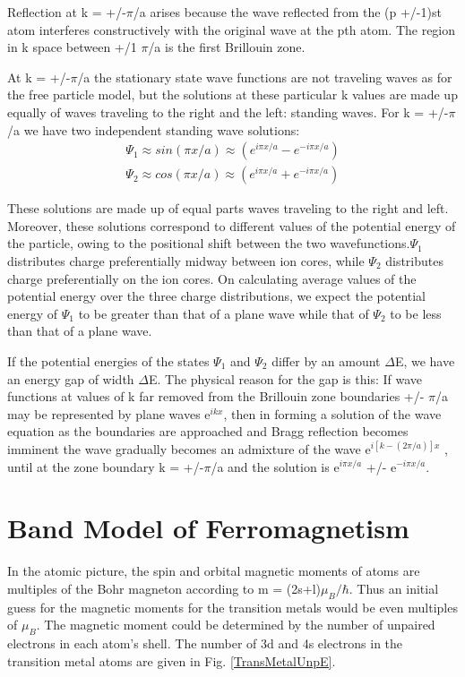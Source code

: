 Reflection at k = +/-$\pi$/a arises because the wave reflected from the (p +/-1)st atom interferes constructively with the original wave at the pth atom. The region in k space between +/1 $\pi$/a is the first Brillouin zone.

At k = +/-$\pi$/a the stationary state wave functions are not traveling waves as for the free particle model, but the solutions at these particular k values are made up equally of waves traveling to the right and the left: standing waves.  For k = +/-$\pi$/a we have two independent standing wave solutions:
\begin{equation}
\begin{split}
\Psi_1 \approx sin(\pi x/a) \approx (e^{i\pi x/a}- e^{-i\pi x /a}) \\
\Psi_2 \approx cos(\pi x/a) \approx (e^{i\pi x/a}+ e^{-i\pi x /a})
\end{split}
\end{equation}

These solutions are made up of equal parts waves traveling to the right and left. Moreover, these solutions correspond to different values of the potential energy of the particle, owing to the positional shift between the two wavefunctions.$\Psi_1$ distributes charge preferentially midway between ion cores, while $\Psi_2$ distributes charge preferentially on the ion cores. On calculating average values of the potential energy over the three charge distributions, we expect the potential energy of $\Psi_1$ to be greater than that of a plane wave while that of $\Psi_2$ to be less than that of a plane wave.

If the potential energies of the states  $\Psi_1$ and $\Psi_2$ differ by an amount $\Delta$E, we have an energy gap  of width $\Delta$E. The physical reason for the gap is this: If wave functions at values of k far removed from the Brillouin zone boundaries +/- $\pi$/a may be represented by plane waves e$^{ikx}$, then in forming a solution of the wave equation as the boundaries are approached and Bragg reflection becomes imminent the wave gradually becomes an admixture of the wave e$^{i[k-(2\pi/a)]x}$ , until at the zone boundary k = +/-$\pi$/a and the solution is e$^{i\pi x/a}$ +/- e$^{-i\pi x /a}$.

\section{Band Model of Ferromagnetism}

In the atomic picture, the spin and orbital magnetic moments of atoms are multiples of the Bohr magneton according to m = (2s+l)$\mu_B/\hbar$. Thus an initial guess for the magnetic moments for the transition metals would be even multiples of $\mu_B$. The magnetic moment could be determined by the number of unpaired electrons in each atom's shell. The number of 3d and 4s electrons in the transition metal atoms are given in Fig. \ref{TransMetalUnpE}.

